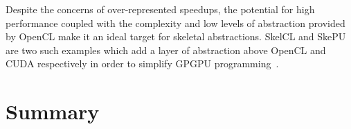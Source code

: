 Despite the concerns of over-represented speedups, the potential for high performance coupled with the complexity and low levels of abstraction provided by OpenCL make it an ideal target for skeletal abstractions. SkelCL and SkePU are two such examples which add a layer of abstraction above OpenCL and CUDA respectively in order to simplify GPGPU programming~\cite{Enmyren2010}.

\section{Summary}
\label{subsec:background-summary}